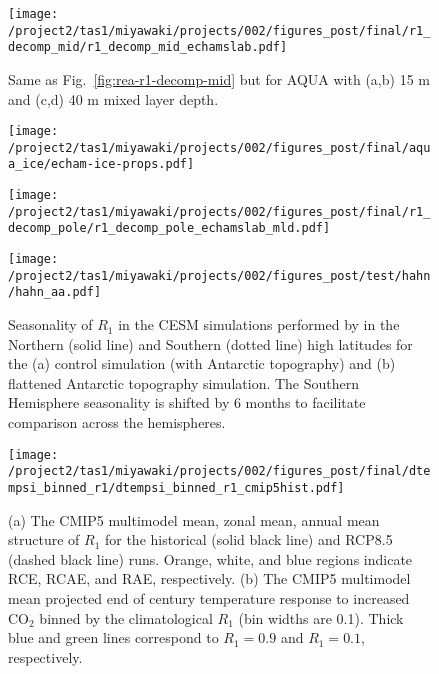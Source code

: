 \documentclass{ametsocV5}
\begin{document}
\begin{figure}[t]
    \noindent\texttt{[image: /project2/tas1/miyawaki/projects/002/figures\_post/final/r1\_decomp\_mid/r1\_decomp\_mid\_echamslab.pdf]}\\
    \caption{Same as Fig.~\ref{fig:rea-r1-decomp-mid} but for AQUA with (a,b) 15 m and (c,d) 40 m mixed layer depth.}
\label{fig:echam-rce}
\end{figure}

\begin{figure}[t]
    \noindent\texttt{[image: /project2/tas1/miyawaki/projects/002/figures\_post/final/aqua\_ice/echam-ice-props.pdf]}\\
    \caption{}
    \label{fig:echam-ice-props}
\end{figure}

\begin{figure}[t]
    \noindent\texttt{[image: /project2/tas1/miyawaki/projects/002/figures\_post/final/r1\_decomp\_pole/r1\_decomp\_pole\_echamslab\_mld.pdf]}\\
    \caption{}
    \label{fig:echam-rae-mld}
\end{figure}

\begin{figure}[t]
    \noindent\texttt{[image: /project2/tas1/miyawaki/projects/002/figures\_post/test/hahn/hahn\_aa.pdf]}\\
    \caption{Seasonality of $R_1$ in the CESM simulations performed by \cite{hahn2020} in the Northern (solid line) and Southern (dotted line) high latitudes for the (a) control simulation (with Antarctic topography) and (b) flattened Antarctic topography simulation. The Southern Hemisphere seasonality is shifted by 6 months to facilitate comparison across the hemispheres.}
    \label{fig:hahn-aa}
\end{figure}

\begin{figure}
  \centering
  \noindent\texttt{[image: /project2/tas1/miyawaki/projects/002/figures\_post/final/dtempsi\_binned\_r1/dtempsi\_binned\_r1\_cmip5hist.pdf]}
  \caption{(a) The CMIP5 multimodel mean, zonal mean, annual mean structure of $R_1$ for the historical (solid black line) and RCP8.5 (dashed black line) runs. Orange, white, and blue regions indicate RCE, RCAE, and RAE, respectively. (b) The CMIP5 multimodel mean projected end of century temperature response to increased CO$_2$ binned by the climatological $R_1$ (bin widths are 0.1). Thick blue and green lines correspond to $R_1=0.9$  and $R_1=0.1$, respectively.}
  \label{fig:cmip5-r1-ann-rcp}
\end{figure}
\end{document}
